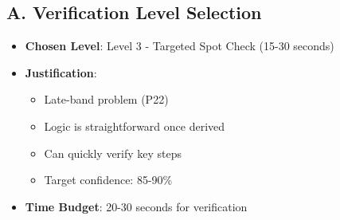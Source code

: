 \documentclass[12pt]{article}
\begin{document}
\begin{verificationbox}
\subsection*{A. Verification Level Selection}
\begin{itemize}[leftmargin=*]
    \item \textbf{Chosen Level}: Level 3 - Targeted Spot Check (15-30 seconds)
    \item \textbf{Justification}: 
    \begin{itemize}
        \item Late-band problem (P22)
        \item Logic is straightforward once derived
        \item Can quickly verify key steps
        \item Target confidence: 85-90\%
    \end{itemize}
    \item \textbf{Time Budget}: 20-30 seconds for verification
\end{itemize}


\end{verificationbox}
\end{document}
